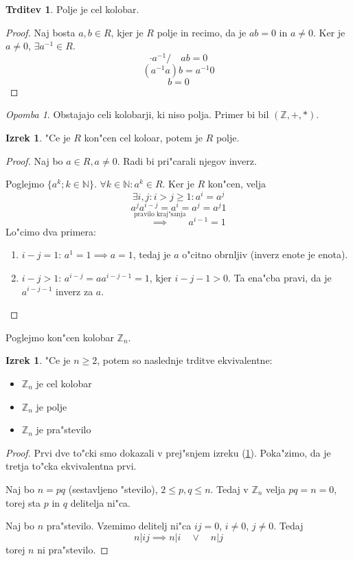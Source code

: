 \documentclass[11pt, a4paper]{article}
\theoremstyle{definition}
\newtheorem{claim}[counter]{Trditev}
\newtheorem{theorem}[counter]{Izrek}
\theoremstyle{remark}
\newtheorem*{rem}{Opomba}
\newcommand{\N}{\mathbb{N}}
\newcommand{\Z}{\mathbb{Z}}
\begin{document}
	\begin{claim}
		Polje je cel kolobar.
	\end{claim}
	\begin{proof}
		Naj bosta $a,b \in R$, kjer je $R$ polje in recimo, da je $ab = 0$ in $a \neq 0$. Ker je $a \neq 0$, $\exists a^{-1} \in R$.
		\[ \cdot a^{-1} / \quad ab = 0 \]
		\[ (a^{-1}a)b = a^{-1}0 \]
		\[ b = 0 \]
	\end{proof}

	\begin{rem}
		Obstajajo celi kolobarji, ki niso polja. Primer bi bil $(\Z, +, *)$.
	\end{rem}

	\begin{theorem}\label{koncen_cel_kolobar_je_polje}
		"Ce je $R$ kon"cen cel koloar, potem je $R$ polje.
	\end{theorem}
	\begin{proof}
		Naj bo $a \in R, a \neq 0$. Radi bi pri"carali njegov inverz.
		
		Poglejmo $ \lbrace a^k; k \in \N \rbrace $.
		$ \forall k \in \N: a^k \in R $. Ker je $R$ kon"cen, velja
		\[ \exists i,j: i > j \geq 1: a^i = a^j \]
		\[ a^j a^{i-j} = a^i = a^j = a^j 1 \]
		\[ \overset{\text{pravilo kraj"sanja}}{\implies} a^{i-1} = 1\]
		Lo"cimo dva primera:
		\begin{enumerate}
			\item $i-j = 1$: $a^1 = 1 \implies a = 1$, tedaj je $a$ o"citno obrnljiv (inverz enote je enota).
			
			\item $i - j > 1$: $a^{i-j} = a a^{i-j-1} = 1$, kjer $i-j-1 > 0$. Ta ena"cba pravi, da je $a^{i-j-1}$ inverz za $a$.
		\end{enumerate}
	\end{proof}
	
	Poglejmo kon"cen kolobar $\Z_n$.
	\begin{theorem}
		"Ce je $n \geq 2$, potem so naslednje trditve ekvivalentne:
		\begin{itemize}
			\item $\Z_n$ je cel kolobar
			\item $\Z_n$ je polje
			\item $\Z_n$ je pra"stevilo
		\end{itemize}
	\end{theorem}
	\begin{proof}
		Prvi dve to"cki smo dokazali v prej"snjem izreku (\ref{koncen_cel_kolobar_je_polje}). Poka"zimo, da je tretja to"cka ekvivalentna prvi.
		
		Naj bo $n = pq$ (sestavljeno "stevilo), $2 \leq p,q \leq n$. Tedaj v $\Z_n$ velja $pq = n = 0$, torej sta $p$ in $q$ delitelja ni"ca.
		
		Naj bo $n$ pra"stevilo. Vzemimo delitelj ni"ca $ij=0$, $i \neq 0$, $j \neq 0$. Tedaj
		\[ n | ij \implies n | i \quad \lor \quad n | j \]
		torej $n$ ni pra"stevilo.
	\end{proof}
\end{document}
